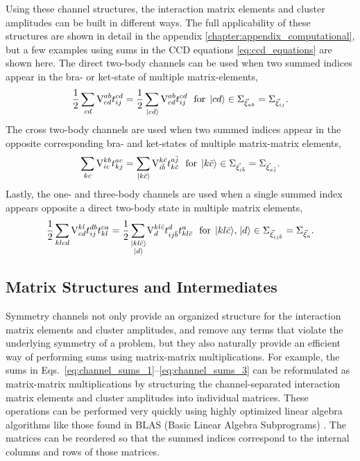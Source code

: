 \documentclass[thesis.tex]{subfiles}
\begin{document}
Using these channel structures, the interaction matrix elements and cluster amplitudes can be built in different ways.  The full applicability of these structures are shown in detail in the appendix \ref{chapter:appendix_computational}, but a few examples using sums in the CCD equations \eqref{eq:ccd_equations} are shown here.  The direct two-body channels can be used when two summed indices appear in the bra- or ket-state of multiple matrix-elements,
\begin{equation} \label{eq:channel_sums_1}
  \frac{1}{2}\sum\limits_{\mathclap{cd}}\vint{ab}{cd}\tamp{cd}{ij} = \frac{1}{2}\sum\limits_{\mathclap{\ket{cd}}}\vint{ab}{cd}\tamp{cd}{ij}\ \ \text{for}\ \ket{cd} \in \Sigma_{\vec{\xi}_{ab}}=\Sigma_{\vec{\xi}_{ij}}.
\end{equation}
The cross two-body channels are used when two summed indices appear in the opposite corresponding bra- and ket-states of multiple matrix-matrix elements,
\begin{equation} \label{eq:channel_sums_2}
  \sum\limits_{\mathclap{kc}}\vint{kb}{ic}\tamp{ac}{kj} = \sum\limits_{\mathclap{\ket{k\bar{c}}}}\vint{k\bar{c}}{i\bar{b}}\tamp{a\bar{j}}{k\bar{c}}\ \ \text{for}\ \ket{k\bar{c}} \in \Sigma_{\vec{\xi}_{i\bar{b}}}=\Sigma_{\vec{\xi}_{a\bar{j}}}.
\end{equation}
Lastly, the one- and three-body channels are used when a single summed index appears opposite a direct two-body state in multiple matrix elements,
\begin{equation} \label{eq:channel_sums_3}
  \frac{1}{2}\sum\limits_{\mathclap{klcd}}\vint{kl}{cd}\tamp{db}{ij}\tamp{ca}{kl} = \frac{1}{2}\sum\limits_{\mathclap{\substack{\ket{kl\bar{c}} \\ \ket{d}}}}\vint{kl\bar{c}}{d}\tamp{d}{ij\bar{b}}\tamp{a}{kl\bar{c}}\ \ \text{for}\ \ket{kl\bar{c}},\ket{d} \in \Sigma_{\vec{\xi}_{ij\bar{b}}}=\Sigma_{\vec{\xi}_{a}}.
\end{equation}


\subsection{Matrix Structures and Intermediates} \label{section:maxtrix_intermediates}

Symmetry channels not only provide an organized structure for the interaction matrix elements and cluster amplitudes, and remove any terms that violate the underlying symmetry of a problem, but they also naturally provide an efficient way of performing sums using matrix-matrix multiplications.  For example, the sums in Eqs.\ \eqref{eq:channel_sums_1}--\eqref{eq:channel_sums_3} can be reformulated as matrix-matrix multiplications by structuring the channel-separated interaction matrix elements and cluster amplitudes into individual matrices.  These operations can be performed very quickly using highly optimized linear algebra algorithms like those found in BLAS (Basic Linear Algebra Subprograms) \cite{blas}.  The matrices can be reordered so that the summed indices correspond to the internal columns and rows of those matrices.
\end{document}
